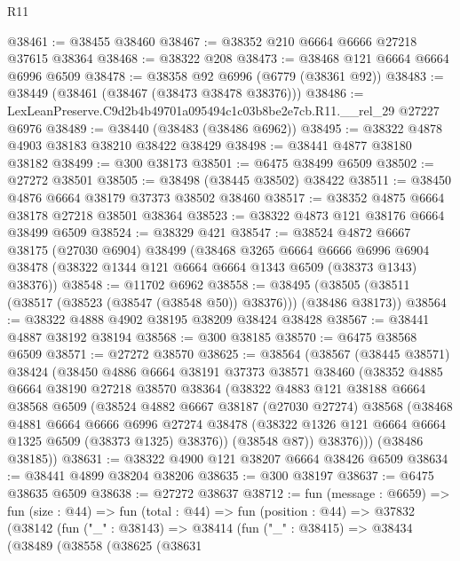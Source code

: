 \begin{lexlean}{R11}
\begin{coremodule}
@38461 := @38455 @38460
@38467 := @38352 @210 @6664 @6666 @27218 @37615 @38364
@38468 := @38322 @208
@38473 := @38468 @121 @6664 @6664 @6996 @6509
@38478 := @38358 @92 @6996 (@6779 (@38361 @92))
@38483 := @38449 (@38461 (@38467 (@38473 @38478 @38376)))
@38486 := LexLeanPreserve.C9d2b4b49701a095494c1c03b8be2e7cb.R11.__rel_29 @27227 @6976
@38489 := @38440 (@38483 (@38486 @6962))
@38495 := @38322 @4878 @4903 @38183 @38210 @38422 @38429
@38498 := @38441 @4877 @38180 @38182
@38499 := @300 @38173
@38501 := @6475 @38499 @6509
@38502 := @27272 @38501
@38505 := @38498 (@38445 @38502) @38422
@38511 := @38450 @4876 @6664 @38179 @37373 @38502 @38460
@38517 := @38352 @4875 @6664 @38178 @27218 @38501 @38364
@38523 := @38322 @4873 @121 @38176 @6664 @38499 @6509
@38524 := @38329 @421
@38547 := @38524
    @4872
    @6667
    @38175
    (@27030 @6904)
    @38499
    (@38468
      @3265
      @6664
      @6666
      @6996
      @6904
      @38478
      (@38322 @1344 @121 @6664 @6664 @1343 @6509 (@38373 @1343) @38376))
@38548 := @11702 @6962
@38558 := @38495 (@38505 (@38511 (@38517 (@38523 (@38547 (@38548 @50)) @38376))) (@38486 @38173))
@38564 := @38322 @4888 @4902 @38195 @38209 @38424 @38428
@38567 := @38441 @4887 @38192 @38194
@38568 := @300 @38185
@38570 := @6475 @38568 @6509
@38571 := @27272 @38570
@38625 := @38564
    (@38567
      (@38445 @38571)
      @38424
      (@38450
        @4886
        @6664
        @38191
        @37373
        @38571
        @38460
        (@38352
          @4885
          @6664
          @38190
          @27218
          @38570
          @38364
          (@38322
            @4883
            @121
            @38188
            @6664
            @38568
            @6509
            (@38524
              @4882
              @6667
              @38187
              (@27030 @27274)
              @38568
              (@38468
                @4881
                @6664
                @6666
                @6996
                @27274
                @38478
                (@38322 @1326 @121 @6664 @6664 @1325 @6509 (@38373 @1325) @38376))
              (@38548 @87))
            @38376)))
      (@38486 @38185))
@38631 := @38322 @4900 @121 @38207 @6664 @38426 @6509
@38634 := @38441 @4899 @38204 @38206
@38635 := @300 @38197
@38637 := @6475 @38635 @6509
@38638 := @27272 @38637
@38712 := fun (message : @6659) =>
  fun (size : @44) =>
  fun (total : @44) =>
  fun (position : @44) =>
  @37832
    (@38142
      (fun ("_" : @38143) =>
      @38414
        (fun ("_" : @38415) =>
        @38434
          (@38489
            (@38558
              (@38625
                (@38631

\end{coremodule}
\end{lexlean}
